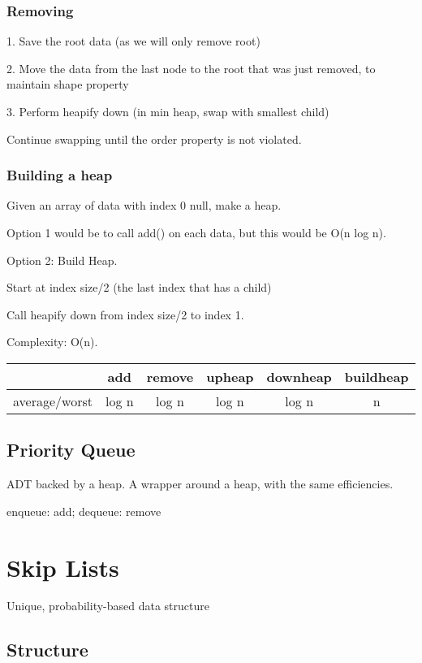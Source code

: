 \documentclass[english,openany]{book}
\begin{document}
	\subsection{Removing}

	1. Save the root data (as we will only remove root)

	2. Move the data from the last node to the root that was just removed, to maintain shape property

	3. Perform heapify down (in min heap, swap with smallest child)

	Continue swapping until the order property is not violated.\\

	\subsection{Building a heap}

	Given an array of data with index 0 null, make a heap.

	Option 1 would be to call add() on each data, but this would be O(n log n).

	Option 2: Build Heap.

	Start at index size/2 (the last index that has a child)

	Call heapify down from index size/2 to index 1.

	Complexity: O(n).

	\begin{tabular}{c|ccccc}
		 &add&remove&upheap&downheap&buildheap\\
		\hline
		average/worst&log n&log n&log n &log n &n\\
	\end{tabular}

	\section{Priority Queue}

	ADT backed by a heap. A wrapper around a heap, with the same efficiencies.

	enqueue: add; dequeue: remove

	\chapter{Skip Lists}

    Unique, probability-based data structure\\

    \section{Structure}
\end{document}
